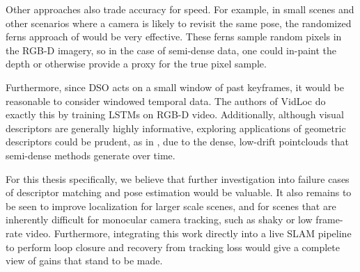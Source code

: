 Other approaches also trade accuracy for speed. For example, in small scenes and other scenarios where a camera is likely to revisit the same pose, the randomized ferns approach of \cite{shotton2013scene} would be very effective. These ferns sample random pixels in the RGB-D imagery, so in the case of semi-dense data, one could in-paint the depth or otherwise provide a proxy for the true pixel sample.

Furthermore, since DSO acts on a small window of past keyframes, it would be reasonable to consider windowed temporal data. The authors of VidLoc \cite{clark2017vidloc} do exactly this by training LSTMs on RGB-D video. Additionally, although visual descriptors are generally highly informative, exploring applications of geometric descriptors could be prudent, as in \cite{zeng20163dmatch}, due to the dense, low-drift pointclouds that semi-dense methods generate over time.

For this thesis specifically, we believe that further investigation into failure cases of descriptor matching and pose estimation would be valuable. It also remains to be seen to improve localization for larger scale scenes, and for scenes that are inherently difficult for monocular camera tracking, such as shaky or low frame-rate video. Furthermore, integrating this work directly into a live SLAM pipeline to perform loop closure and recovery from tracking loss would give a complete view of gains that stand to be made.

\cleardoublepage

